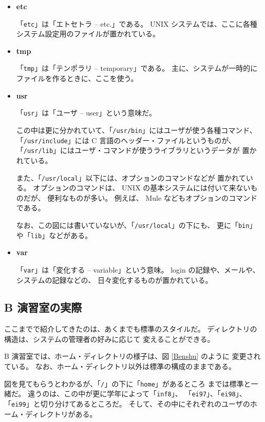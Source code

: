 \begin{itemize}
「\texttt{/}」の下の「\texttt{bin}」、つまり「\texttt{/bin}」には、
 UNIX システムの一番基本的なコマンドが置いてある。

\item \textbf{\large etc}

「\texttt{etc}」は「エトセトラ -- etc.」である。
 UNIX システムでは、ここに各種システム設定用のファイルが置かれている。

\item \textbf{\large tmp}

「\texttt{tmp}」は「テンポラリ -- temporary」である。
主に、システムが一時的にファイルを作るときに、ここを使う。

\item \textbf{\large usr}

「\texttt{usr}」は「ユーザ -- user」という意味だ。

この中は更に分かれていて、「\texttt{/usr/bin}」にはユーザが使う各種コマンド、
「\texttt{/usr/include}」には C 言語のヘッダー・ファイルというものが、
「\texttt{/usr/lib}」にはユーザ・コマンドが使うライブラリというデータが
置かれている。

また、「\texttt{/usr/local}」以下には、オプションのコマンドなどが
置かれている。
オプションのコマンドは、 UNIX の基本システムには付いて来ないものだが、
便利なものが多い。
例えば、 Mule などもオプションのコマンドである。

なお、この図には書いていないが、「\texttt{/usr/local}」の下にも、
更に「\texttt{bin}」や「\texttt{lib}」などがある。

\item \textbf{\large var}

「\texttt{var}」は「変化する -- variable」という意味。
 login の記録や、メールや、システムの記録などの、
日々変化するものが置かれている。
\end{itemize}

\newpage

\subsection{B 演習室の実際}

ここまでで紹介してきたのは、あくまでも標準のスタイルだ。
ディレクトリの構造は、システムの管理者の好みに応じて
変えることができる。

B 演習室では、ホーム・ディレクトリの様子は、図 \ref{Benshu} のように
変更されている。
なお、ホーム・ディレクトリ以外は標準の構成のままである。

図を見てもらうとわかるが、「\texttt{/}」の下に「\texttt{home}」があるところ
までは標準と一緒だ。
違うのは、この中が更に学年によって「\texttt{inf8}」、
「\texttt{ei97}」、「\texttt{ei98}」、「\texttt{ei99}」と切り分けてあるところだ。
そして、その中にそれぞれのユーザのホーム・ディレクトリがある。

